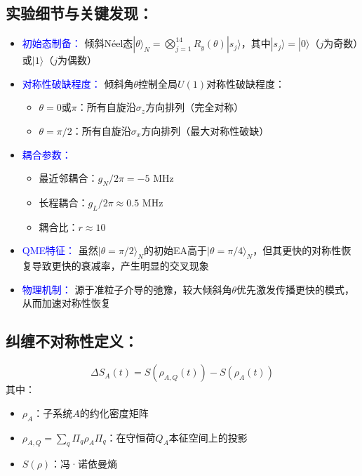\documentclass[11pt,a4paper]{article}
\begin{document}
\subsection{实验细节与关键发现：}
\begin{itemize}
    \item \textcolor{blue}{初始态制备：} 倾斜Néel态$|\theta\rangle_N = \bigotimes_{j=1}^{14} R_y(\theta)|s_j\rangle$，其中$|s_j\rangle = |0\rangle$（$j$为奇数）或$|1\rangle$（$j$为偶数）
    \item \textcolor{blue}{对称性破缺程度：} 倾斜角$\theta$控制全局$U(1)$对称性破缺程度：
    \begin{itemize}
        \item $\theta=0$或$\pi$：所有自旋沿$\sigma_z$方向排列（完全对称）
        \item $\theta=\pi/2$：所有自旋沿$\sigma_x$方向排列（最大对称性破缺）
    \end{itemize}
    \item \textcolor{blue}{耦合参数：} 
    \begin{itemize}
        \item 最近邻耦合：$g_N/2\pi = -5$ MHz
        \item 长程耦合：$g_L/2\pi \approx 0.5$ MHz
        \item 耦合比：$r \approx 10$
    \end{itemize}
    \item \textcolor{blue}{QME特征：} 虽然$|\theta=\pi/2\rangle_N$的初始EA高于$|\theta=\pi/4\rangle_N$，但其更快的对称性恢复导致更快的衰减率，产生明显的交叉现象
    \item \textcolor{blue}{物理机制：} 源于准粒子介导的弛豫，较大倾斜角$\theta$优先激发传播更快的模式，从而加速对称性恢复
\end{itemize}

\subsection{纠缠不对称性定义：}
\begin{equation}
\Delta S_A(t) = S(\rho_{A,Q}(t)) - S(\rho_A(t))
\end{equation}
其中：
\begin{itemize}
    \item $\rho_A$：子系统$A$的约化密度矩阵
    \item $\rho_{A,Q} = \sum_q \Pi_q \rho_A \Pi_q$：在守恒荷$Q_A$本征空间上的投影
    \item $S(\rho)$：冯·诺依曼熵
\end{itemize}
\end{document}
